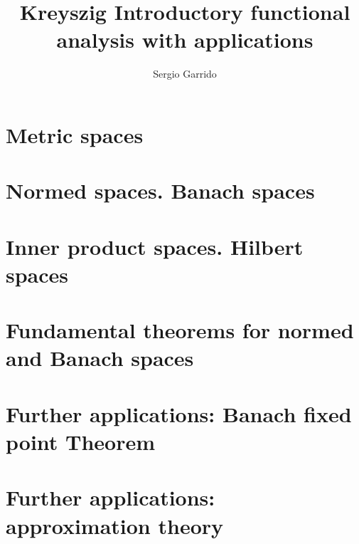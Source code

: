 \documentclass{bookSolutions}
\title{Kreyszig  Introductory functional analysis with applications}
\author{Sergio Garrido}
\begin{document}
\maketitle

\tableofcontents

\section{Metric spaces}







\section{Normed spaces. Banach spaces}











\section{Inner product spaces. Hilbert spaces}











\section{Fundamental theorems for normed and Banach spaces}














\section{Further applications: Banach fixed point Theorem}


\section{Further applications: approximation theory}

\end{document}
